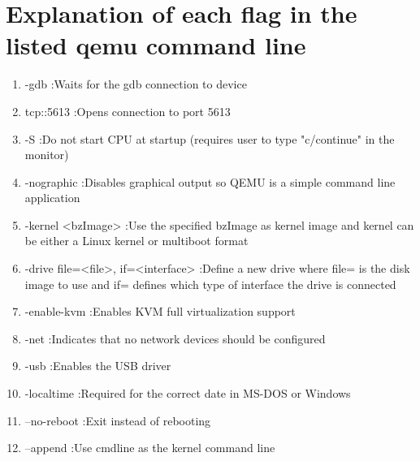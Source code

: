 \documentclass[IEEEtran,letterpaper,10pt,notitlepage,draftclsnofoot,onecolumn]{article}
\begin{document}
\section{Explanation of each flag in the listed qemu command line}
\begin{enumerate}
\item -gdb :Waits for the gdb connection to device 
\item tcp::5613 :Opens connection to port 5613
\item -S :Do not start CPU at startup (requires user to type 
  "c/continue" in the monitor)
\item -nographic :Disables graphical output so QEMU is a 
  simple command line application
\item -kernel <bzImage> :Use the specified bzImage as kernel image 
  and kernel can be either a Linux kernel or multiboot format
\item -drive file=<file>, if=<interface> :Define a new drive where file= 
  is the disk image to use and if= defines which type of interface the drive is connected
\item -enable-kvm :Enables KVM full virtualization support
\item -net :Indicates that no network devices should be configured
\item -usb :Enables the USB driver
\item -localtime :Required for the correct date in MS-DOS or Windows
\item --no-reboot :Exit instead of rebooting
\item --append :Use cmdline as the kernel command line
\end{enumerate}
\end{document}

